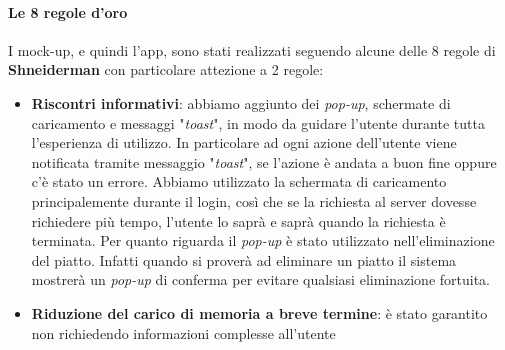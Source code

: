 \paragraph{Le 8 regole d'oro}
I mock-up, e quindi l'app, sono stati realizzati seguendo alcune delle 8 regole di \textbf{Shneiderman} con particolare attezione a 2 regole:
\begin{itemize}
  \item \textbf{Riscontri informativi}: abbiamo aggiunto dei \textit{pop-up}, schermate di caricamento e messaggi "\textit{toast}", in modo da guidare l'utente durante tutta l'esperienza di utilizzo. 
  In particolare ad ogni azione dell'utente viene notificata tramite messaggio "\textit{toast}", se l'azione è andata a buon fine oppure c'è stato un errore. Abbiamo utilizzato la schermata di caricamento principalemente durante il login, così che se la richiesta al server dovesse richiedere più tempo, l'utente lo saprà e saprà quando la richiesta è terminata.
  Per quanto riguarda il \textit{pop-up} è stato utilizzato nell'eliminazione del piatto. Infatti quando si proverà ad eliminare un piatto il sistema mostrerà un \textit{pop-up} di conferma per evitare qualsiasi eliminazione fortuita.
  \item \textbf{Riduzione del carico di memoria a breve termine}: è stato garantito non richiedendo informazioni complesse all'utente
\end{itemize}